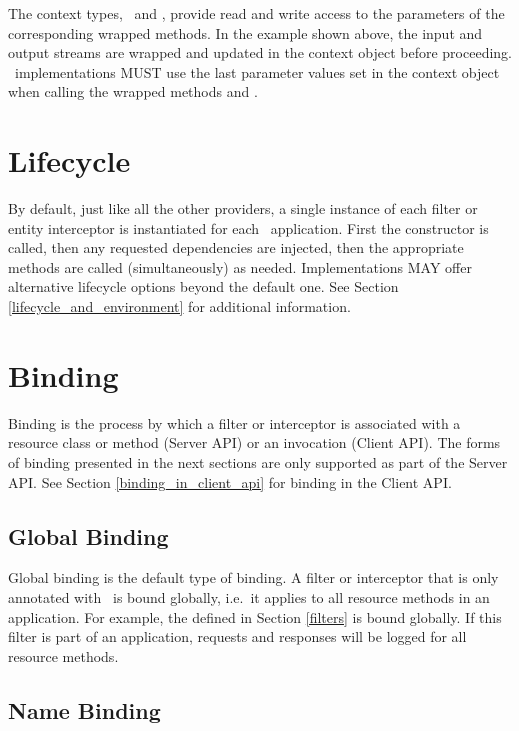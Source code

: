 The context types, \ReaderInterceptorContext\ and \WriterInterceptorContext, provide read and write access to the parameters of the corresponding wrapped methods. In the example shown above, the input and output streams are wrapped and updated in the context object before proceeding. \jaxrs\ implementations MUST use the last parameter values set in the context object when calling the wrapped methods  and .

\section{Lifecycle}

By default, just like all the other providers, a single instance of each filter or entity interceptor is instantiated for each \jaxrs\ application. First the constructor is called, then any requested dependencies are injected, then the appropriate methods are called (simultaneously) as needed. Implementations MAY offer alternative lifecycle options beyond the default one. See Section \ref{lifecycle_and_environment} for additional information.

\section{Binding}

Binding is the process by which a filter or interceptor is associated with a resource class or method (Server API) or an invocation (Client API). The forms of binding presented in the next sections are only supported as part of the Server API. See Section \ref{binding_in_client_api} for binding in the Client API.

\subsection{Global Binding}
\label{global_binding}

Global binding is the default type of binding. A filter or interceptor that is only annotated with \Provider\ is bound globally, i.e.~it applies to all resource methods in an application. For example, the  defined in Section \ref{filters} is bound globally. If this filter is part of an application, requests and responses will be logged for all resource methods. 

\subsection{Name Binding}
\label{Name_Binding}

